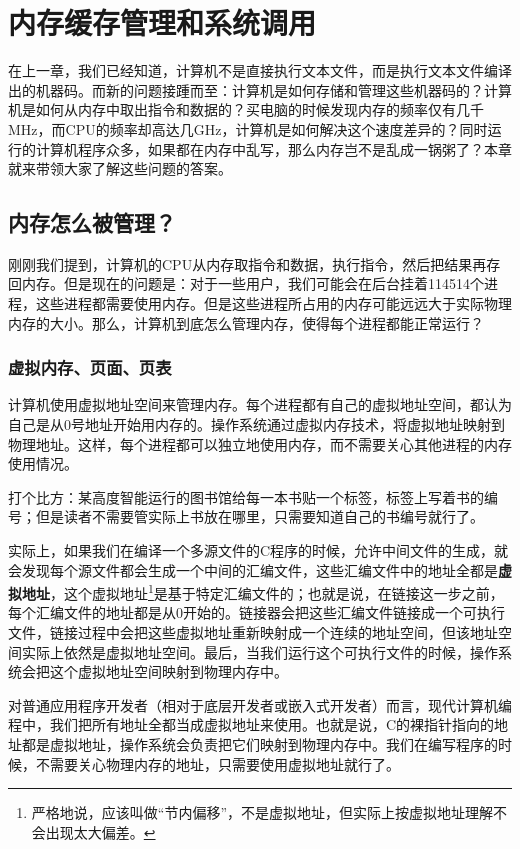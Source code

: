 \chapter{内存缓存管理和系统调用}\label{chap:ics-2}

在上一章，我们已经知道，计算机不是直接执行文本文件，而是执行文本文件编译出的机器码。而新的问题接踵而至：计算机是如何存储和管理这些机器码的？计算机是如何从内存中取出指令和数据的？买电脑的时候发现内存的频率仅有几千MHz，而CPU的频率却高达几GHz，计算机是如何解决这个速度差异的？同时运行的计算机程序众多，如果都在内存中乱写，那么内存岂不是乱成一锅粥了？本章就来带领大家了解这些问题的答案。

\section{内存怎么被管理？}

刚刚我们提到，计算机的CPU从内存取指令和数据，执行指令，然后把结果再存回内存。但是现在的问题是：对于一些用户，我们可能会在后台挂着114514个进程，这些进程都需要使用内存。但是这些进程所占用的内存可能远远大于实际物理内存的大小。那么，计算机到底怎么管理内存，使得每个进程都能正常运行？

\subsection{虚拟内存、页面、页表}

计算机使用虚拟地址空间来管理内存。每个进程都有自己的虚拟地址空间，都认为自己是从0号地址开始用内存的。操作系统通过虚拟内存技术，将虚拟地址映射到物理地址。这样，每个进程都可以独立地使用内存，而不需要关心其他进程的内存使用情况。

打个比方：某高度智能运行的图书馆给每一本书贴一个标签，标签上写着书的编号；但是读者不需要管实际上书放在哪里，只需要知道自己的书编号就行了。

实际上，如果我们在编译一个多源文件的C程序的时候，允许中间文件的生成，就会发现每个源文件都会生成一个中间的汇编文件，这些汇编文件中的地址全都是\textbf{虚拟地址}，这个虚拟地址\footnote{严格地说，应该叫做“节内偏移”，不是虚拟地址，但实际上按虚拟地址理解不会出现太大偏差。}是基于特定汇编文件的；也就是说，在链接这一步之前，每个汇编文件的地址都是从0开始的。链接器会把这些汇编文件链接成一个可执行文件，链接过程中会把这些虚拟地址重新映射成一个连续的地址空间，但该地址空间实际上依然是虚拟地址空间。最后，当我们运行这个可执行文件的时候，操作系统会把这个虚拟地址空间映射到物理内存中。

对普通应用程序开发者（相对于底层开发者或嵌入式开发者）而言，现代计算机编程中，我们把所有地址全都当成虚拟地址来使用。也就是说，C的裸指针指向的地址都是虚拟地址，操作系统会负责把它们映射到物理内存中。我们在编写程序的时候，不需要关心物理内存的地址，只需要使用虚拟地址就行了。

